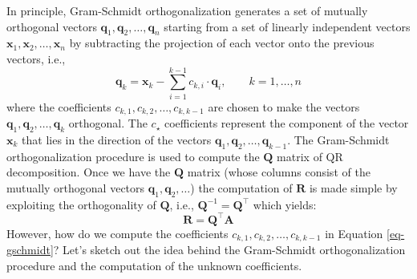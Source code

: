 \documentclass{article}[11pt]
\begin{document}
In principle, Gram-Schmidt orthogonalization generates a set of mutually orthogonal vectors $\mathbf{q}_{1},\mathbf{q}_{2},\hdots,
\mathbf{q}_{n}$ starting from a set of linearly independent vectors $\mathbf{x}_{1},\mathbf{x}_{2},\hdots,\mathbf{x}_{n}$ 
by subtracting the projection of each vector onto the previous vectors, i.e.,
\begin{equation}\label{eq-gschmidt}
\mathbf{q}_{k}=\mathbf{x}_{k}-\sum_{i=1}^{k-1}c_{k,i}\cdot\mathbf{q}_{i},
\qquad{k=1,\hdots,n}
\end{equation}where the coefficients $c_{k,1},c_{k,2},\hdots,c_{k,k-1}$ are chosen to make the vectors $\mathbf{q}_{1},\mathbf{q}_{2},\hdots,\mathbf{q}_{k}$ orthogonal.
The $c_{\star}$ coefficients represent the component of the vector $\mathbf{x}_{k}$ that lies in the direction of the vectors $\mathbf{q}_{1},\mathbf{q}_{2},\hdots,\mathbf{q}_{k-1}$.
The Gram-Schmidt orthogonalization procedure is used to compute the $\mathbf{Q}$ matrix of QR decomposition.
Once we have the $\mathbf{Q}$ matrix (whose columns consist of the mutually orthogonal vectors $\mathbf{q}_{1},\mathbf{q}_{2},\dots$) the computation
of $\mathbf{R}$ is made simple by exploiting the orthogonality of $\mathbf{Q}$, i.e., $\mathbf{Q}^{-1}=\mathbf{Q}^{\top}$ which yields:
\begin{equation}
\mathbf{R}=\mathbf{Q}^{\top}\mathbf{A}
\end{equation}
However, how do we compute the coefficients $c_{k,1},c_{k,2},\hdots,c_{k,k-1}$ in Equation \ref{eq-gschmidt}?
Let's sketch out the idea behind the Gram-Schmidt orthogonalization procedure and the computation of the unknown coefficients.
\end{document}

